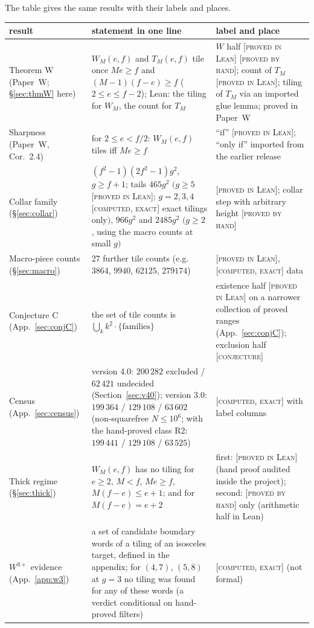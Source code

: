 \documentclass[11pt,reqno]{amsart}
\theoremstyle{plain}
\theoremstyle{definition}
\newcommand{\lab}[1]{\textup{[\textsc{#1}]}}
\newcommand{\PL}{\lab{proved in Lean}}
\newcommand{\PH}{\lab{proved by hand}}
\newcommand{\CE}{\lab{computed, exact}}
\newcommand{\CJ}{\lab{conjecture}}
\begin{document}
The table gives the same results with their labels and places.
\begin{center}
\small
\begin{tabular}{@{}p{2.8cm}p{5.6cm}p{4.4cm}@{}}
\toprule
result & statement in one line & label and place\\
\midrule
Theorem W (Paper~W; \S\ref{sec:thmW} here) & $W_M(e,f)$ and $T_M(e,f)$ tile once $Me\ge f$ and $(M-1)(f-e)\ge f$ ($2\le e\le f-2$); Lean: the tiling for $W_M$, the count for $T_M$ & $W$ half \PL{} \PH{}; count of $T_M$ \PL{}; tiling of $T_M$ via an imported glue lemma; proved in Paper~W\\
Sharpness (Paper~W, Cor.~2.4) & for $2\le e<f/2$: $W_M(e,f)$ tiles iff $Me\ge f$ & ``if'' \PL{}; ``only if'' imported from the earlier release\\
Collar family (\S\ref{sec:collar}) & $(f^2-1)(2f^2-1)g^2$, $g\ge f+1$; tails $465g^2$ $(g\ge5$ \PL{}; $g=2,3,4$ \CE{} exact tilings only$)$, $966g^2$ and $2485g^2$ $(g\ge2$, using the macro counts at small $g)$ & \PL{}; collar step with arbitrary height \PH{}\\
Macro-piece counts (\S\ref{sec:macro}) & 27 further tile counts (e.g.\ $3864$, $9940$, $62125$, $279174$) & \PL{}, \CE{} data\\
Conjecture C (App.~\ref{sec:conjC}) & the set of tile counts is $\bigcup_k k^2\cdot\{\text{families}\}$ & existence half \PL{} on a narrower collection of proved ranges (App.~\ref{sec:conjC}); exclusion half \CJ{}\\
Census (App.~\ref{sec:census}) & version 4.0: $200\,282$ excluded / $62\,421$ undecided (Section~\ref{sec:v40}); version 3.0: $199\,364$ / $129\,108$ / $63\,602$ (non-squarefree $N\le10^6$; with the hand-proved class R2: $199\,441$ / $129\,108$ / $63\,525$) & \CE{} with label columns\\
Thick regime (\S\ref{sec:thick}) & $W_M(e,f)$ has no tiling for $e\ge2$, $M<f$, $Me\ge f$, $M(f-e)\le e+1$; and for $M(f-e)=e+2$ & first: \PL{} (hand proof audited inside the project); second: \PH{} only (arithmetic half in Lean)\\
$W^{3+}$ evidence (App.~\ref{app:w3}) & a set of candidate boundary words of a tiling of an isosceles target, defined in the appendix; for $(4,7)$, $(5,8)$ at $g=3$ no tiling was found for any of these words (a verdict conditional on hand-proved filters) & \CE{} (not formal)\\
\bottomrule
\end{tabular}
\end{center}
\end{document}
